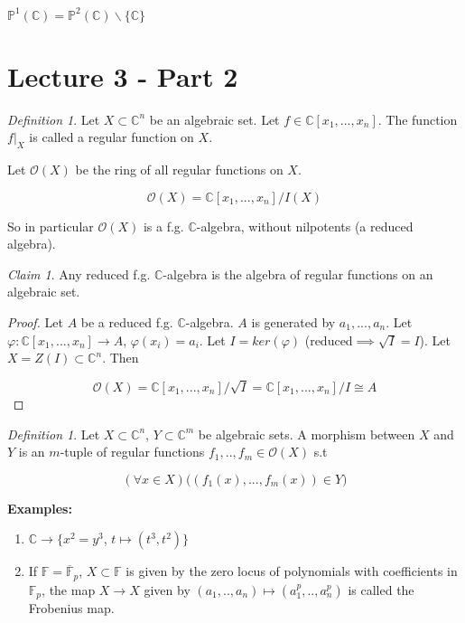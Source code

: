 \documentclass[12pt]{article}
\theoremstyle{remark}
\newtheorem{definition}[theorem]{Definition}
\newtheorem{claim}[theorem]{Claim}
\begin{document}
$\mathbb{P}^1(\mathbb{C})=\mathbb{P}^2(\mathbb{C})\backslash\{\mathbb{C}\}$

\section{ Lecture 3 - Part 2}

\begin{definition}

Let $X\subset \mathbb{C}^n$ be an algebraic set. Let $f\in \mathbb{C}[x_1,...,x_n]$. The function $f|_X$ is called a regular function on $X$.

\end{definition}

Let $\mathcal{O}(X)$ be the ring of all regular functions on $X$.

\[
    \mathcal{O}(X) = \mathbb{C}[x_1,...,x_n]/I(X)
\]

So in particular $\mathcal{O}(X)$ is a f.g. $\mathbb{C}$-algebra, without nilpotents (a reduced algebra).

\begin{claim}

Any reduced f.g. $\mathbb{C}$-algebra is the algebra of regular functions on an algebraic set.

\end{claim}

\begin{proof}

Let $A$ be a reduced f.g. $\mathbb{C}$-algebra. $A$ is generated by $a_1,...,a_n$. Let $\varphi :\mathbb{C}[x_1,...,x_n]\rightarrow A$, $\varphi(x_i)=a_i$. Let $I=ker(\varphi)$ (reduced$\implies \sqrt{I}=I$). Let $X=Z(I)\subset \mathbb{C}^n$. Then

\[
    \mathcal{O}(X)=\mathbb{C}[x_1,...,x_n]/\sqrt{I}=\mathbb{C}[x_1,...,x_n]/I \cong A
\]

\end{proof}

\begin{definition}

Let $X\subset \mathbb{C}^n$, $Y\subset \mathbb{C}^m$ be algebraic sets. A morphism between $X$ and $Y$ is an  $m$-tuple of regular functions $f_1,..,f_m\in \mathcal{O}(X)$ s.t

\[
    (\forall x\in X)\big((f_1(x),...,f_m(x))\in Y)
\]

\end{definition}

\textbf{Examples:}

\begin{enumerate}

    \item $\mathbb{C}\rightarrow \{x^2=y^3$, $t\mapsto (t^3,t^2) \}$

    \item If $\mathbb{F}=\overline{\mathbb{F}}_p$, $X\subset \mathbb{F }$ is given by the zero locus of polynomials with coefficients in $\mathbb{F}_p$, the map $X\rightarrow X$ given by $(a_1,..,a_n)\mapsto (a_1^p,..,a_n^p)$ is called the Frobenius map.

\end{enumerate}
\end{document}

